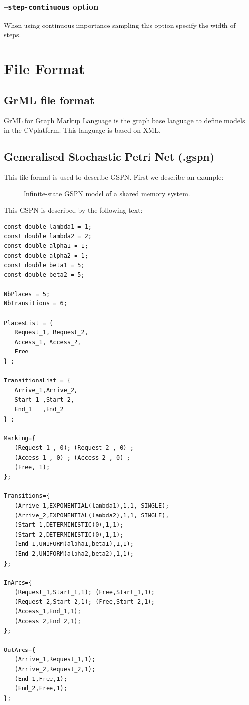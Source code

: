 \documentclass{article}
\newcommand{\cosyverif}{\mbox{\textup{C}\scalebox{0.75}{{\textsc{OSY}}}\textup{V}\scalebox{0.75}{{\textsc{ERIF}}}}}
\begin{document}
\subsubsection{\texttt{--step-continuous} option}
When using continuous importance sampling this option specify the width
of steps.


\section{File Format}
\label{sec:fileformat}

\subsection{GrML file format}
GrML for Graph Markup Language is the graph base language to define
models in the \cosyverif platform. This language is based on XML.


\subsection{Generalised Stochastic Petri Net (.gspn)}
This file format is used to describe GSPN.
First we describe an example:\\
\begin{figure}[h]
  \centering
  
  \caption{Infinite-state GSPN  model of a shared memory system.}
  \label{fig:sharedmem}
\end{figure}
This GSPN is described by the following text:

\begin{scriptsize}
\begin{verbatim}
const double lambda1 = 1;
const double lambda2 = 2;
const double alpha1 = 1;
const double alpha2 = 1;
const double beta1 = 5;
const double beta2 = 5;

NbPlaces = 5;
NbTransitions = 6;

PlacesList = { 
   Request_1, Request_2,
   Access_1, Access_2,
   Free
} ;

TransitionsList = { 
   Arrive_1,Arrive_2,
   Start_1 ,Start_2,
   End_1   ,End_2
} ;

Marking={
   (Request_1 , 0); (Request_2 , 0) ; 
   (Access_1 , 0) ; (Access_2 , 0) ;
   (Free, 1);
};

Transitions={
   (Arrive_1,EXPONENTIAL(lambda1),1,1, SINGLE); 
   (Arrive_2,EXPONENTIAL(lambda2),1,1, SINGLE);
   (Start_1,DETERMINISTIC(0),1,1); 
   (Start_2,DETERMINISTIC(0),1,1);
   (End_1,UNIFORM(alpha1,beta1),1,1); 
   (End_2,UNIFORM(alpha2,beta2),1,1);
};

InArcs={
   (Request_1,Start_1,1); (Free,Start_1,1);
   (Request_2,Start_2,1); (Free,Start_2,1);
   (Access_1,End_1,1);
   (Access_2,End_2,1);
};

OutArcs={
   (Arrive_1,Request_1,1); 
   (Arrive_2,Request_2,1);
   (End_1,Free,1);
   (End_2,Free,1);
};
\end{verbatim}
\end{scriptsize}
\end{document}
